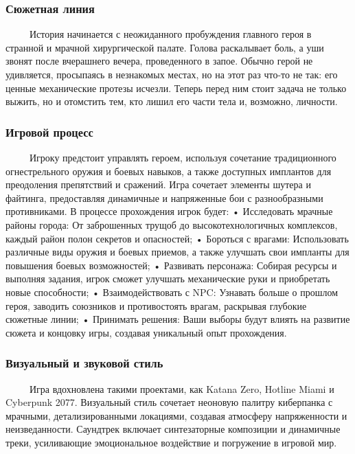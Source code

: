 \documentclass{article}
\begin{document}
\subsubsection{Сюжетная линия}

\ \ \ \ \ История начинается с неожиданного пробуждения главного героя в странной и мрачной хирургической палате. Голова раскалывает боль, а уши звонят после вчерашнего вечера, проведенного в запое. Обычно герой не удивляется, просыпаясь в незнакомых местах, но на этот раз что-то не так: его ценные механические протезы исчезли. Теперь перед ним стоит задача не только выжить, но и отомстить тем, кто лишил его части тела и, возможно, личности.

\subsubsection{Игровой процесс}

\ \ \ \ \ Игроку предстоит управлять героем, используя сочетание традиционного огнестрельного оружия и боевых навыков, а также доступных имплантов для преодоления препятствий и сражений. Игра сочетает элементы шутера и файтинга, предоставляя динамичные и напряженные бои с разнообразными противниками. В процессе прохождения игрок будет:
 • Исследовать мрачные районы города: От заброшенных трущоб до высокотехнологичных комплексов, каждый район полон секретов и опасностей;
 • Бороться с врагами: Использовать различные виды оружия и боевых приемов, а также улучшать свои импланты для повышения боевых возможностей;
 • Развивать персонажа: Собирая ресурсы и выполняя задания, игрок сможет улучшать механические руки и приобретать новые способности;
 • Взаимодействовать с NPC: Узнавать больше о прошлом героя, заводить союзников и противостоять врагам, раскрывая глубокие сюжетные линии;
 • Принимать решения: Ваши выборы будут влиять на развитие сюжета и концовку игры, создавая уникальный опыт прохождения.

\subsubsection{Визуальный и звуковой стиль}

\ \ \ \ \ Игра вдохновлена такими проектами, как Katana Zero, Hotline Miami и Cyberpunk 2077. Визуальный стиль сочетает неоновую палитру киберпанка с мрачными, детализированными локациями, создавая атмосферу напряженности и неизведанности. Саундтрек включает синтезаторные композиции и динамичные треки, усиливающие эмоциональное воздействие и погружение в игровой мир.
\end{document}
